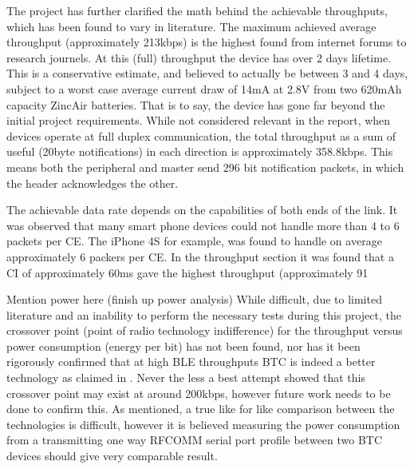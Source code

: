 \documentclass[]{article}
\begin{document}
The project has further clarified the math behind the achievable throughputs, which has been found to vary in literature. The maximum achieved average throughput (approximately 213kbps) is the highest found from internet forums to research journels. At this (full) throughput the device has over 2 days lifetime. This is a conservative estimate, and believed to actually be between 3 and 4 days, subject to a worst case average current draw of 14mA at 2.8V from two 620mAh capacity ZincAir batteries. That is to say, the device has gone far beyond the initial project requirements. While not considered relevant in the report, when devices operate at full duplex communication, the total throughput as a sum of useful (20byte notifications) in each direction is approximately 358.8kbps. This means both the peripheral and master send 296 bit notification packets, in which the header acknowledges the other.

The achievable data rate depends on the capabilities of both ends of the link. It was observed that many smart phone devices could not handle more than 4 to 6 packets per \ac{CE}. The iPhone 4S for example, was found to handle on average approximately 6 packers per \ac{CE}. In the throughput section it was found that a \ac{CI} of approximately 60ms gave the highest throughput (approximately 91%

Mention power here (finish up power analysis)
While difficult, due to limited literature and an inability to perform the necessary tests during this project, the crossover point (point of radio technology indifference) for the throughput versus power consumption (energy per bit) has not been found, nor has it been rigorously confirmed that at high \ac{BLE} throughputs \ac{BTC} is indeed a better technology as claimed in \cite{sig}. Never the less a best attempt showed that this crossover point may exist at around 200kbps, however future work needs to be done to confirm this. As mentioned, a true like for like comparison between the technologies is difficult, however it is believed measuring the power consumption from a transmitting one way RFCOMM serial port profile between two \ac{BTC} devices should give very comparable result. 
\end{document}

